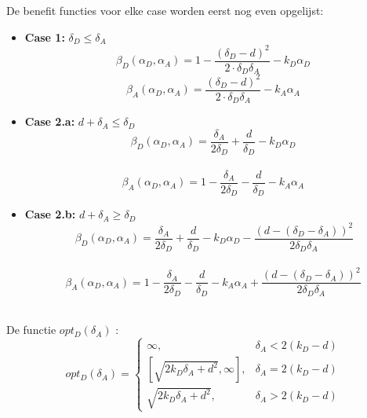 \documentclass[master=cws, masteroption=vs,english]{kulemt}
\begin{document}
\begin{abstract*}
De benefit functies voor elke case worden eerst nog even opgelijst:

\begin{itemize}
\item \textbf{Case 1:} $\delta_{D} \leq \delta_{A} $ 
 \begin{equation*}
\beta_{D}(\alpha_{D},\alpha_{A}) = 1 - \dfrac { (\delta_{D}-d) ^{2}} {2 \cdot \delta_{D}  \delta_{A}} - k_{D} \alpha_{D}
\end{equation*}
\begin{equation*}
\beta_{A}(\alpha_{D},\alpha_{A}) = \dfrac { (\delta_{D}-d) ^{2}} {2 \cdot \delta_{D}  \delta_{A}} - k_{A} \alpha_{A}
\end{equation*}
\item \textbf{Case 2.a:} $d + \delta_{A} \leq \delta_{D}$
\begin{equation*}
\beta_{D}(\alpha_{D},\alpha_{A}) = \dfrac{\delta_{A}}{2\delta_{D}} + \dfrac{d}{\delta_{D}} - k_{D} \alpha_{D} 
\end{equation*}\\
\begin{equation*}
\beta_{A}(\alpha_{D},\alpha_{A}) = 1 -\dfrac{\delta_{A}}{2\delta_{D}} - \dfrac{d}{\delta_{D}} - k_{A} \alpha_{A} 
\end{equation*}
\item \textbf{Case 2.b:} $d + \delta_{A} \geq \delta_{D}$
\begin{equation*}\
\beta_{D}(\alpha_{D},\alpha_{A}) = \dfrac{\delta_{A}}{2\delta_{D}} + \dfrac{d}{\delta_{D}} - k_{D} \alpha_{D} - \dfrac{(d - (\delta_{D} - \delta_{A}))^{2}}{2 \delta_{D} \delta_{A}}
\end{equation*}\\
 \begin{equation*}
\beta_{A}(\alpha_{D},\alpha_{A}) = 1 -\dfrac{\delta_{A}}{2\delta_{D}} - \dfrac{d}{\delta_{D}} - k_{A} \alpha_{A} + \dfrac{(d - (\delta_{D} - \delta_{A}))^{2}}{2 \delta_{D} \delta_{A}}
\end{equation*}\\
\end{itemize}

De functie $opt_{D}(\delta_{A})$ :
 \begin{displaymath}
  opt_{D}(\delta_{A}) = \left\{
     \begin{array}{lr}
          \infty , & \delta_{A} < 2(k_{D} - d)\\
      \left[ \sqrt{2k_{D}\delta_{A} + d^{2}},\infty\right] , & \delta_{A} = 2(k_{D} - d) \\
      \sqrt{2k_{D}\delta_{A} + d^{2}}, & \delta_{A} > 2(k_{D} - d)
     \end{array}
   \right.
\end{displaymath}


\end{abstract*}
\end{document}
